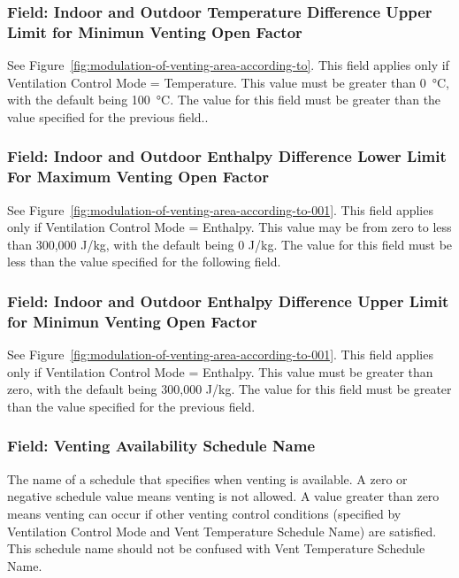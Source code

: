 \subsubsection{Field: Indoor and Outdoor Temperature Difference Upper Limit for Minimun Venting Open Factor}\label{field-indoor-and-outdoor-temperature-difference-upper-limit-for-minimun-venting-open-factor}

See Figure~\ref{fig:modulation-of-venting-area-according-to}. This field applies only if Ventilation Control Mode = Temperature. This value must be greater than \SI{0}{\celsius}, with the default being \SI{100}{\celsius}. The value for this field must be greater than the value specified for the previous field..

\subsubsection{Field: Indoor and Outdoor Enthalpy Difference Lower Limit For Maximum Venting Open Factor}\label{field-indoor-and-outdoor-enthalpy-difference-lower-limit-for-maximum-venting-open-factor}

See Figure~\ref{fig:modulation-of-venting-area-according-to-001}. This field applies only if Ventilation Control Mode = Enthalpy. This value may be from zero to less than 300,000 J/kg, with the default being 0 J/kg. The value for this field must be less than the value specified for the following field.

\subsubsection{Field: Indoor and Outdoor Enthalpy Difference Upper Limit for Minimun Venting Open Factor}\label{field-indoor-and-outdoor-enthalpy-difference-upper-limit-for-minimun-venting-open-factor}

See Figure~\ref{fig:modulation-of-venting-area-according-to-001}. This field applies only if Ventilation Control Mode = Enthalpy. This value must be greater than zero, with the default being 300,000 J/kg. The value for this field must be greater than the value specified for the previous field.

\subsubsection{Field: Venting Availability Schedule Name}\label{field-venting-availability-schedule-name}

The name of a schedule that specifies when venting is available. A zero or negative schedule value means venting is not allowed. A value greater than zero means venting can occur if other venting control conditions (specified by Ventilation Control Mode and Vent Temperature Schedule Name) are satisfied. This schedule name should not be confused with Vent Temperature Schedule Name.

